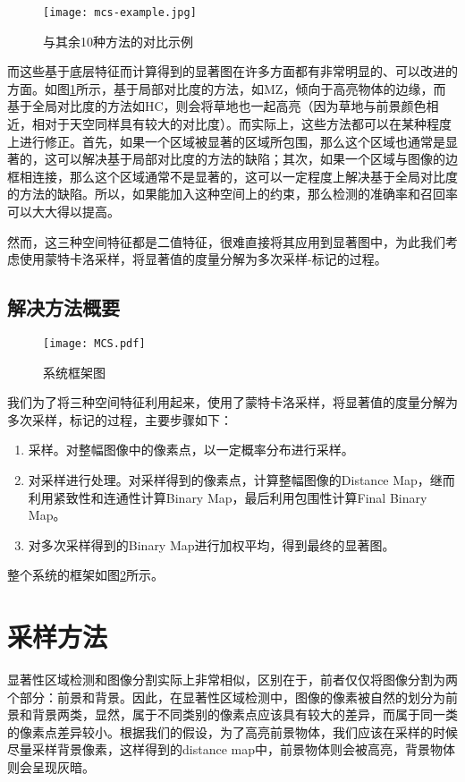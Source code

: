 \begin{figure}
\centering
\texttt{[image: mcs-example.jpg]}
\caption{与其余10种方法的对比示例}\label{fig:mcs_comp}
\end{figure}
而这些基于底层特征而计算得到的显著图在许多方面都有非常明显的、可以改进的方面。如图\ref{fig:mcs_comp}所示，基于局部对比度的方法，如MZ\cite{ma2003contrast}，倾向于高亮物体的边缘，而基于全局对比度的方法如HC\cite{cheng2011global}，则会将草地也一起高亮（因为草地与前景颜色相近，相对于天空同样具有较大的对比度）。而实际上，这些方法都可以在某种程度上进行修正。首先，如果一个区域被显著的区域所包围，那么这个区域也通常是显著的，这可以解决基于局部对比度的方法的缺陷；其次，如果一个区域与图像的边框相连接，那么这个区域通常不是显著的，这可以一定程度上解决基于全局对比度的方法的缺陷。所以，如果能加入这种空间上的约束，那么检测的准确率和召回率可以大大得以提高。

然而，这三种空间特征都是二值特征，很难直接将其应用到显著图中，为此我们考虑使用蒙特卡洛采样，将显著值的度量分解为多次采样-标记的过程。

\subsection{解决方法概要}
\begin{figure}
\centering
\texttt{[image: MCS.pdf]}
\caption{系统框架图}\label{fig:mcs}
\end{figure}

我们为了将三种空间特征利用起来，使用了蒙特卡洛采样，将显著值的度量分解为多次采样，标记的过程，主要步骤如下：
\begin{enumerate}
\item 采样。对整幅图像中的像素点，以一定概率分布进行采样。
\item 对采样进行处理。对采样得到的像素点，计算整幅图像的Distance Map，继而利用紧致性和连通性计算Binary Map，最后利用包围性计算Final Binary Map。
\item 对多次采样得到的Binary Map进行加权平均，得到最终的显著图。
\end{enumerate}
整个系统的框架如图\ref{fig:mcs}所示。

\section{采样方法}
显著性区域检测和图像分割实际上非常相似，区别在于，前者仅仅将图像分割为两个部分：前景和背景。因此，在显著性区域检测中，图像的像素被自然的划分为前景和背景两类，显然，属于不同类别的像素点应该具有较大的差异，而属于同一类的像素点差异较小。根据我们的假设，为了高亮前景物体，我们应该在采样的时候尽量采样背景像素，这样得到的distance map中，前景物体则会被高亮，背景物体则会呈现灰暗。

